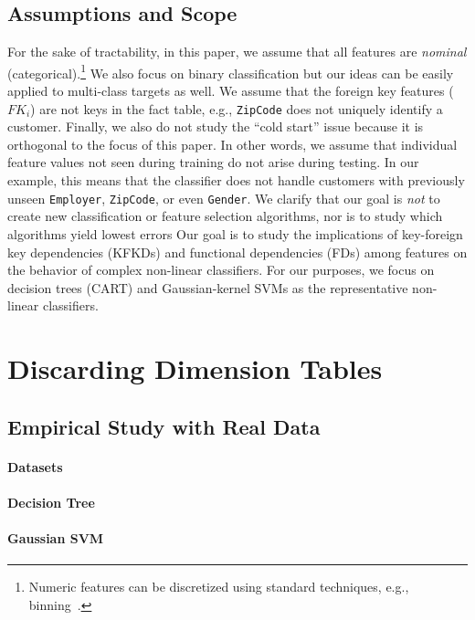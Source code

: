 \documentclass[sigconf]{acmart}
\begin{document}
\subsection{Assumptions and Scope}
For the sake of tractability, in this paper, we assume that all features are \textit{nominal} (categorical).\footnote{Numeric features can be discretized 
using standard techniques, e.g., binning~\cite{mitchell}.} We also focus on binary classification but our ideas can be easily applied to multi-class targets as well.
We assume that the foreign key features ($FK_i$) are not keys in the fact table, e.g., \texttt{ZipCode} does not uniquely identify a customer.
Finally, we also do not study the ``cold start'' issue because it is orthogonal to the focus of this paper. 
In other words, we assume that individual feature values not seen during training do not arise during testing. 
In our example, this means that the classifier does not handle customers with previously unseen \texttt{Employer}, \texttt{ZipCode}, or even \texttt{Gender}. 
We clarify that our goal is \textit{not} to create new classification or feature selection algorithms, nor is to study which algorithms yield lowest errors
Our goal is to study the implications of key-foreign key dependencies (KFKDs) and functional dependencies (FDs) among features on the behavior of complex non-linear classifiers.
For our purposes, we focus on decision trees (CART) and Gaussian-kernel SVMs as the representative non-linear classifiers.




\section{Discarding Dimension Tables}

\subsection{Empirical Study with Real Data}

\paragraph*{Datasets}

\paragraph*{Decision Tree}

\paragraph*{Gaussian SVM}
\end{document}
